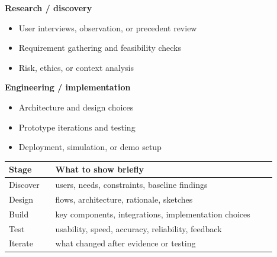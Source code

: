 
\begin{minipage}[t]{0.48\linewidth}
\textbf{Research / discovery}
\begin{itemize}
  \item User interviews, observation, or precedent review
  \item Requirement gathering and feasibility checks
  \item Risk, ethics, or context analysis
\end{itemize}
\end{minipage}
\hfill
\begin{minipage}[t]{0.48\linewidth}
\textbf{Engineering / implementation}
\begin{itemize}
  \item Architecture and design choices
  \item Prototype iterations and testing
  \item Deployment, simulation, or demo setup
\end{itemize}
\end{minipage}

\vspace{0.4em}
\begin{center}
\begin{tabular}{p{0.16\linewidth}p{0.76\linewidth}}
\toprule
\textbf{Stage} & \textbf{What to show briefly} \\
\midrule
Discover & users, needs, constraints, baseline findings \\
Design   & flows, architecture, rationale, sketches \\
Build    & key components, integrations, implementation choices \\
Test     & usability, speed, accuracy, reliability, feedback \\
Iterate  & what changed after evidence or testing \\
\bottomrule
\end{tabular}
\end{center}
